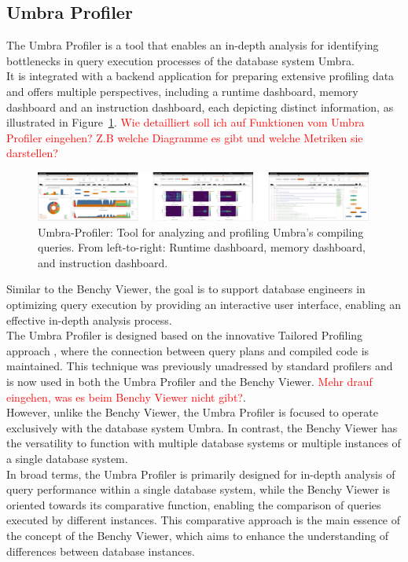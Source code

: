 \subsection{Umbra Profiler}
The Umbra Profiler is a tool that enables an in-depth analysis for identifying bottlenecks in query execution processes of the database system Umbra.
\\ It is integrated with a backend application for preparing extensive profiling data and offers multiple perspectives, including a runtime dashboard, memory dashboard and an instruction dashboard, each depicting distinct information, as illustrated in Figure~\ref{fig:umbra-profiler}.
\textcolor{red}{Wie detailliert soll ich auf Funktionen vom Umbra Profiler eingehen? Z.B welche Diagramme es gibt und welche Metriken sie darstellen? }
\begin{figure}[h]
    \centering
    \includegraphics[width=1\linewidth]{figures/umbra-profiler.png}
    \caption{Umbra-Profiler: Tool for analyzing and profiling Umbra’s compiling queries. From left-to-right: Runtime dashboard, memory dashboard, and instruction dashboard.}
    \label{fig:umbra-profiler}
  \end{figure}

\noindent Similar to the Benchy Viewer, the goal is to support database engineers in optimizing query execution by providing an interactive user interface, enabling an effective in-depth analysis process. 
\\The Umbra Profiler is designed based on the innovative Tailored Profiling approach \cite{profiling-dataflow}, where the connection between query plans and compiled code is maintained. This technique was previously unadressed by standard profilers and is now used in both the Umbra Profiler and the Benchy Viewer.  
\textcolor{red}{Mehr drauf eingehen, was es beim Benchy Viewer nicht gibt?}.
\\However, unlike the Benchy Viewer, the Umbra Profiler is focused to operate exclusively with the database system Umbra. In contrast, the Benchy Viewer has the versatility to function with multiple database systems or multiple instances of a single database system.
\\In broad terms, the Umbra Profiler is primarily designed for in-depth analysis of query performance within a single database system, while the Benchy Viewer is oriented towards its comparative function, enabling the comparison of queries executed by different instances. This comparative approach is the main essence  of the concept of the Benchy Viewer, which aims to enhance the understanding of differences between database instances.



